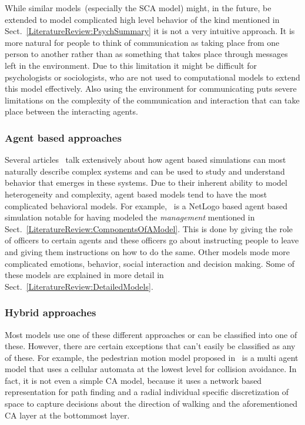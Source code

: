 While similar models~(especially the SCA model) might, in the future, be extended to model complicated high level behavior of the kind mentioned in Sect.~\ref{LiteratureReview:PsychSummary} it is not a very intuitive approach. It is more natural for people to think of communication as taking place from one person to another rather than as something that takes place through messages left in the environment. Due to this limitation it might be difficult for psychologists or sociologists, who are not used to computational models to extend this model effectively. Also using the environment for communicating puts severe limitations on the complexity of the communication and interaction that can take place between the interacting agents.

\subsubsection{Agent based approaches}
Several articles~\cite{Epstein:1999vn,Bonabeau:2002um,Li:2008wt} talk extensively about how agent based simulations can most naturally describe complex systems and can be used to study and understand behavior that emerges in these systems. Due to their inherent ability to model heterogeneity and complexity, agent based models tend to have the most complicated behavioral models. For example,~\cite{AugustijnBeckers:2010cr} is a NetLogo based agent based simulation notable for having modeled the \emph{management} mentioned in Sect.~\ref{LiteratureReview:ComponentsOfAModel}. This is done by giving the role of officers to certain agents and these officers go about instructing people to leave and giving them instructions on how to do the same. Other models mode more complicated emotions, behavior, social interaction and decision making. Some of these models are explained in more detail in Sect.~\ref{LiteratureReview:DetailedModels}.

\subsubsection{Hybrid approaches}
Most models use one of these different approaches or can be classified into one of these. However, there are certain exceptions that can't easily be classified as any of these. For example, the pedestrian motion model proposed in~\cite{Bierlaire:2003uj} is a multi agent model that uses a cellular automata at the lowest level for collision avoidance. In fact, it is not even a simple CA model, because it uses a network based representation for path finding and a radial individual specific discretization of space to capture decisions about the direction of walking and the aforementioned CA layer at the bottommost layer.

